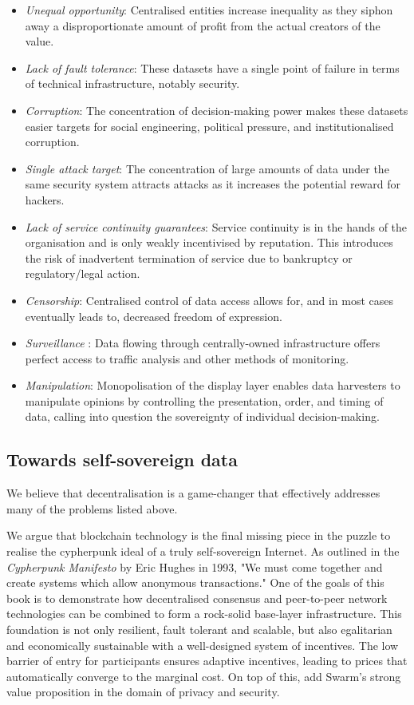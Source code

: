 \begin{itemize}[noitemsep]
    \item \emph{Unequal opportunity}\/: Centralised entities increase inequality as they siphon away a disproportionate amount of profit from the actual creators of the value.
    \item \emph{Lack of fault tolerance}\/: These datasets have a single point of failure in terms of technical infrastructure, notably security.
    \item \emph{Corruption}\/: The concentration of decision-making power makes these datasets easier targets for social engineering, political pressure, and institutionalised corruption.
    \item \emph{Single attack target}\/: The concentration of large amounts of data under the same security system attracts attacks as it increases the potential reward for hackers. 
    \item \emph{Lack of service continuity guarantees}\/: Service continuity is in the hands of the organisation and is only weakly incentivised by reputation. This introduces the risk of inadvertent termination of service due to bankruptcy or regulatory/legal action.
    \item \emph{Censorship}\/: Centralised control of data access allows for, and in most cases eventually leads to, decreased freedom of expression.
    \item \emph{Surveillance} \/: Data flowing through centrally-owned infrastructure offers perfect access to traffic analysis and other methods of monitoring.
    \item \emph{Manipulation}\/: Monopolisation of the display layer enables data harvesters to manipulate opinions by controlling the presentation, order, and timing of data, calling into question the sovereignty of individual decision-making.
\end{itemize}


\subsection{Towards self-sovereign data \statusgreen} \label{sec:selfsovereigndata}

We believe that decentralisation is a game-changer that effectively addresses many of the problems listed above.

We argue that blockchain technology is the final missing piece in the puzzle to realise the cypherpunk ideal of a truly self-sovereign Internet. As outlined in the \emph{Cypherpunk Manifesto} \cite{hughes1993} by Eric Hughes in 1993, "We must come together and create systems which allow anonymous transactions." One of the goals of this book is to demonstrate how decentralised consensus and peer-to-peer network technologies can be combined to form a rock-solid base-layer infrastructure. This foundation is not only resilient, fault tolerant and scalable, but also egalitarian and economically sustainable with a well-designed system of incentives. The low barrier of entry for participants ensures adaptive incentives, leading to prices that 
 automatically converge to the marginal cost. On top of this, add Swarm's strong value proposition in the domain of privacy and security.

